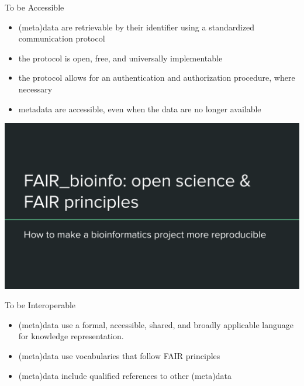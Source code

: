 \begin{frame}
\begin{block}{To be Accessible}
\begin{itemize}
\item (meta)data are retrievable by their identifier using a standardized communication protocol
\item the protocol is open, free, and universally implementable
\item the protocol allows for an authentication and authorization procedure, where necessary
\item metadata are accessible, even when the data are no longer available
\end{itemize}
\end{block}
\end{frame}

\begin{frame}
\includegraphics[page=10,scale=0.55]{images/01_OS_and_FAIR_intro.pdf}
\end{frame}

\begin{frame}
\begin{block}{To be Interoperable}
\begin{itemize}
\item (meta)data use a formal, accessible, shared, and broadly applicable language for knowledge representation.
\item (meta)data use vocabularies that follow FAIR principles
\item (meta)data include qualified references to other (meta)data
\end{itemize}
\end{block}
\end{frame}

